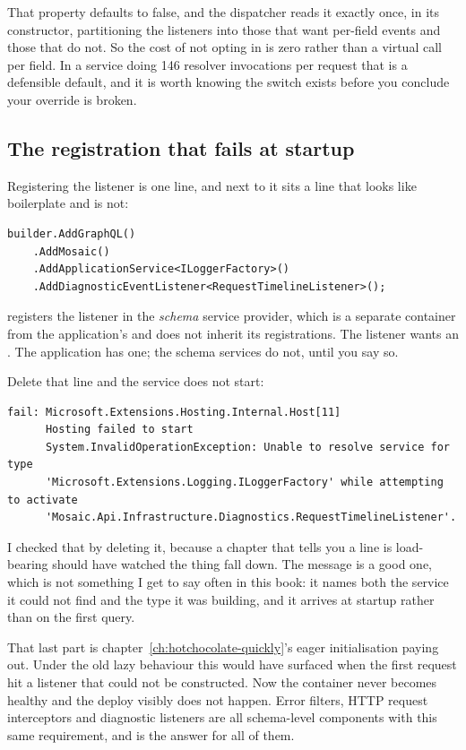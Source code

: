 That property defaults to false, and the dispatcher reads it exactly once, in
its constructor, partitioning the listeners into those that want per-field
events and those that do not. So the cost of not opting in is zero rather than a
virtual call per field. In a service doing 146 resolver invocations per request
that is a defensible default, and it is worth knowing the switch exists before
you conclude your override is broken.

\subsection*{The registration that fails at startup}

%
Registering the listener is one line, and next to it sits a line that looks like
boilerplate and is not:

\begin{verbatim}
builder.AddGraphQL()
    .AddMosaic()
    .AddApplicationService<ILoggerFactory>()
    .AddDiagnosticEventListener<RequestTimelineListener>();
\end{verbatim}

 registers the listener in the \emph{schema}
service provider, which is a separate container from the application's and does
not inherit its registrations. The listener wants an . The
application has one; the schema services do not, until you say so.

Delete that line and the service does not start:

\begin{verbatim}
fail: Microsoft.Extensions.Hosting.Internal.Host[11]
      Hosting failed to start
      System.InvalidOperationException: Unable to resolve service for type
      'Microsoft.Extensions.Logging.ILoggerFactory' while attempting to activate
      'Mosaic.Api.Infrastructure.Diagnostics.RequestTimelineListener'.
\end{verbatim}

I checked that by deleting it, because a chapter that tells you a line is
load-bearing should have watched the thing fall down. The message is a good one,
which is not something I get to say often in this book: it names both the
service it could not find and the type it was building, and it arrives at
startup rather than on the first query.

That last part is chapter~\ref{ch:hotchocolate-quickly}'s eager initialisation
paying out. Under the old lazy behaviour this would have surfaced when the first
request hit a listener that could not be constructed. Now the container never
becomes healthy and the deploy visibly does not happen. Error filters, HTTP
request interceptors and diagnostic listeners are all schema-level components
with this same requirement, and  is the answer
for all of them.

